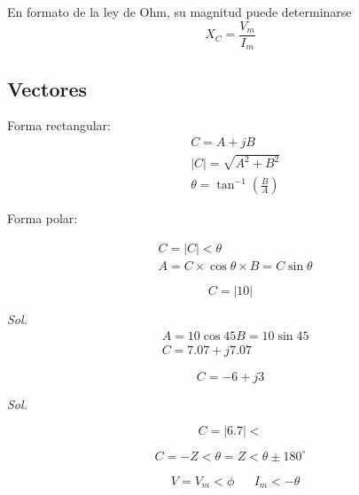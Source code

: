 En formato de la ley de Ohm, su magnitud puede determinarse
\begin{equation}
	X_{C}=\frac{V_{m}}{I_{m}}
\end{equation}

\subsection{Vectores}

Forma rectangular:
\begin{align}
	 & C=A+jB                                     \\
	 & \left\lvert C \right\rvert =\sqrt{A^2+B^2} \\
	 & \theta=\tan^{-1} \left( \frac{B}{A}\right)
\end{align}

Forma polar:

\begin{align*}
	 & C=\left\lvert C \right\rvert <\theta          \\
	 & A=C\times\cos{\theta} \times B=C \sin{\theta}
\end{align*}

\begin{example}
	\begin{equation*}
		C=\left\lvert 10 \right\rvert
	\end{equation*}
\end{example}

\textit{Sol. }
\begin{align*}
	 & A=10\cos{45}B=10\sin{45} \\
	 & C=7{.}07+j7{.}07
\end{align*}

\begin{example}
	\begin{equation*}
		C=-6+j3
	\end{equation*}
\end{example}

\textit{Sol. }

\begin{equation*}
	C=\left\lvert 6{.}7 \right\rvert  <
\end{equation*}

\begin{equation}
	C=-Z< \theta =Z< \theta \pm 180^{\circ}
\end{equation}


\begin{align}
	 & V=V_{m}<\phi &  & I_{m}<-\theta
\end{align}

